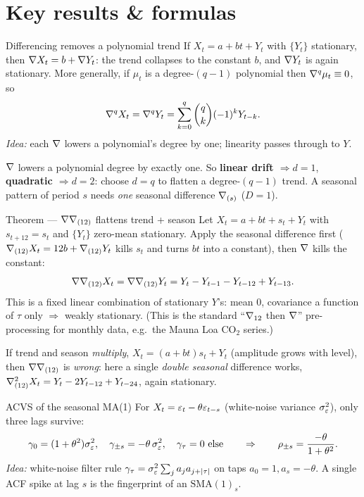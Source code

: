 \documentclass[11pt]{article}
\begin{document}
\section*{Key results \& formulas}

\begin{result}{Differencing removes a polynomial trend}
If $X_t=a+bt+Y_t$ with $\{Y_t\}$ stationary, then $\nabla X_t=b+\nabla Y_t$: the trend collapses to the constant $b$, and $\nabla Y_t$ is again stationary. More generally, if $\mu_t$ is a degree-$(q-1)$ polynomial then $\nabla^{q}\mu_t\equiv0$, so
\[
\nabla^{q}X_t=\nabla^{q}Y_t=\sum_{k=0}^{q}\binom{q}{k}(-1)^{k}Y_{t-k}.
\]
\textit{Idea:} each $\nabla$ lowers a polynomial's degree by one; linearity passes through to $Y$.
\end{result}

\begin{intu}
$\nabla$ lowers a polynomial degree by exactly one. So \textbf{linear drift $\Rightarrow d=1$}, \textbf{quadratic $\Rightarrow d=2$}: choose $d=q$ to flatten a degree-$(q-1)$ trend. A seasonal pattern of period $s$ needs \emph{one} seasonal difference $\nabla_{(s)}$ ($D=1$).
\end{intu}

\begin{result}{Theorem --- $\nabla\nabla_{(12)}$ flattens trend + season}
Let $X_t=a+bt+s_t+Y_t$ with $s_{t+12}=s_t$ and $\{Y_t\}$ zero-mean stationary. Apply the seasonal difference first ($\nabla_{(12)}X_t=12b+\nabla_{(12)}Y_t$ kills $s_t$ and turns $bt$ into a constant), then $\nabla$ kills the constant:
\[
\nabla\nabla_{(12)}X_t=\nabla\nabla_{(12)}Y_t=Y_t-Y_{t-1}-Y_{t-12}+Y_{t-13}.
\]
This is a fixed linear combination of stationary $Y$'s: mean $0$, covariance a function of $\tau$ only $\Rightarrow$ weakly stationary. (This is the standard ``$\nabla_{12}$ then $\nabla$'' pre-processing for monthly data, e.g.\ the Mauna Loa CO$_2$ series.)
\end{result}

\begin{intu}
If trend and season \emph{multiply}, $X_t=(a+bt)s_t+Y_t$ (amplitude grows with level), then $\nabla\nabla_{(12)}$ is \emph{wrong}: here a single \emph{double seasonal} difference works, $\nabla_{(12)}^{2}X_t=Y_t-2Y_{t-12}+Y_{t-24}$, again stationary.
\end{intu}

\begin{result}{ACVS of the seasonal MA(1)}
For $X_t=\varepsilon_t-\theta\varepsilon_{t-s}$ (white-noise variance $\sigma_\varepsilon^2$), only three lags survive:
\[
\gamma_0=(1+\theta^{2})\sigma_\varepsilon^2,\quad \gamma_{\pm s}=-\theta\,\sigma_\varepsilon^2,\quad \gamma_\tau=0\ \text{else}
\qquad\Rightarrow\qquad \rho_{\pm s}=\frac{-\theta}{1+\theta^{2}}.
\]
\textit{Idea:} white-noise filter rule $\gamma_\tau=\sigma_\varepsilon^2\sum_j a_ja_{j+\left\lvert \tau \right\rvert}$ on taps $a_0=1,a_s=-\theta$. A single ACF spike at lag $s$ is the fingerprint of an $\mathrm{SMA}(1)_s$.
\end{result}
\end{document}
